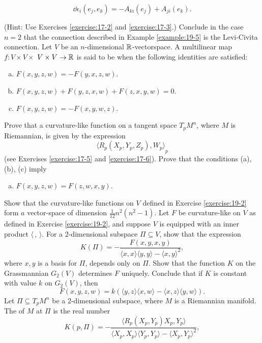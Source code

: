 \begin{enumerate}[label=\theexercise.\arabic*.,ref=\theexercise.\arabic*,leftmargin=2.7em]
    \[
      \dd{\epsilon }_{i}( {{e}_{j},{e}_{k}})  = - {A}_{ki}( {e}_{j})  + {A}_{ji}( {e}_{k}).
    \]
    \par(Hint: Use Exercises \ref{exercise:17-2} and \ref{exercise:17-3}.)
    Conclude in the case $n = 2$ that the connection described in Example \ref{example:19-5} is the Levi-Civita connection.
  \NewItem Let $V$ be an $n$-dimensional $\mathbb{R}$-vectorspace. A multilinear map $f\colon V \times  V \times$  $V \times  V \rightarrow  \mathbb{R}$ is said to be  when the following identities are satisfied:
    \begin{enumerate}[(a)]
      \item $F( {x,y,z,w})  = - F( {y,x,z,w})$.
      \item $F( {x,y,z,w})  + F( {y,z,x,w})  + F( {z,x,y,w})  = 0$.
      \item $F( {x,y,z,w})  = - F( {x,y,w,z})$.
    \end{enumerate}
    Prove that a curvature-like function on a tangent space ${T}_{p}{M}^{n}$, where $M$ is Riemannian, is given by the expression
    \[
      {\langle  {R}_{p}( {X}_{p},{Y}_{p},{Z}_{p}),{W}_{p}\rangle  }_{p}
    \]
    (see Exercises \ref{exercise:17-5} and \ref{exercise:17-6}). Prove that the conditions (a), (b), (c) imply
    \begin{enumerate}[(d)]
      \item $F( {x,y,z,w})  = F( {z,w,x,y})$.
    \end{enumerate}
  \NewItem Show that the curvature-like functions on $V$ defined in Exercise \ref{exercise:19-2} form $a$ vector-space of dimension $\frac{1}{12}{n}^{2}( {{n}^{2}- 1}).$
  \NewItem Let $F$ be curvature-like on $V$ as defined in Exercise \ref{exercise:19-2}, and suppose $V$ is equipped with an inner product $\langle\,, \,\rangle$. For a 2-dimensional subspace $\Pi  \subseteq  V$, show that the expression
    \[
      K( \Pi )  = - \frac{F( {x,y,x,y}) }{\langle x,x\rangle \langle y,y\rangle-\langle x,y{\rangle }^{2}},
    \]
    where $x,y$ is a basis for $\Pi$, depends only on $\Pi$. Show that the function $K$ on the Grassmannian ${G}_{2}( V)$ determines $F$ uniquely. Conclude that if $K$ is constant with value $k$ on ${G}_{2}( V)$, then
    \[
      F( {x,y,z,w})  = k( {\langle y,z\rangle \langle x,w\rangle-\langle x,z\rangle \langle y,w\rangle }).
    \]
  \NewItem Let $\Pi \subseteq  {T}_{p}{M}^{n}$ be a 2-dimensional subspace, where $M$ is a Riemannian manifold. The  of $M$ at $\Pi$ is the real number
    \[
      K( {p,\Pi })  = - \frac{\langle  {R}_{p}( {X}_{p},{Y}_{p}) {X}_{p},{Y}_{p}\rangle  }{\langle  {{X}_{p},{X}_{p}}\rangle  \langle  {{Y}_{p},{Y}_{p}}\rangle  - {\langle  {X}_{p},{Y}_{p}\rangle  }^{2}},
\]
\end{enumerate}
